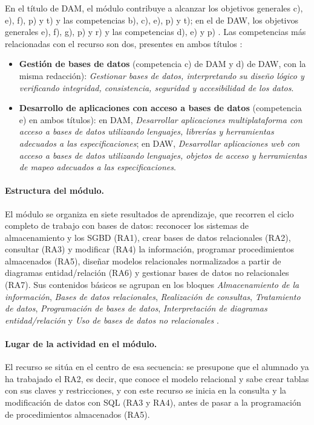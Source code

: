 \documentclass[11pt,a4paper]{article}
\begin{document}
En el título de DAM, el módulo contribuye a alcanzar los objetivos generales c), e), f), p)
y t) y las competencias b), c), e), p) y t); en el de DAW, los objetivos generales e), f), g),
p) y r) y las competencias d), e) y p) \cite{rd405}. Las competencias más relacionadas con el
recurso son dos, presentes en ambos títulos \cite{rd450,rd686}:
\begin{itemize}
  \item \textbf{Gestión de bases de datos} (competencia c) de DAM y d) de DAW, con la misma
        redacción): \textit{Gestionar bases de datos, interpretando su diseño lógico y
        verificando integridad, consistencia, seguridad y accesibilidad de los datos}.
  \item \textbf{Desarrollo de aplicaciones con acceso a bases de datos} (competencia e) en
        ambos títulos): en DAM, \textit{Desarrollar aplicaciones multiplataforma con acceso a
        bases de datos utilizando lenguajes, librerías y herramientas adecuados a las
        especificaciones}; en DAW, \textit{Desarrollar aplicaciones web con acceso a bases de
        datos utilizando lenguajes, objetos de acceso y herramientas de mapeo adecuados a las
        especificaciones}.
\end{itemize}

\paragraph{Estructura del módulo.} El módulo se organiza en siete resultados de aprendizaje,
que recorren el ciclo completo de trabajo con bases de datos: reconocer los sistemas de
almacenamiento y los SGBD (RA1), crear bases de datos relacionales (RA2), consultar (RA3)
y modificar (RA4) la información, programar procedimientos almacenados (RA5), diseñar
modelos relacionales normalizados a partir de diagramas entidad/relación (RA6) y gestionar
bases de datos no relacionales (RA7). Sus contenidos básicos se agrupan en los bloques
\emph{Almacenamiento de la información}, \emph{Bases de datos relacionales},
\emph{Realización de consultas}, \emph{Tratamiento de datos}, \emph{Programación de bases de
datos}, \emph{Interpretación de diagramas entidad/relación} y \emph{Uso de bases de datos no
relacionales} \cite{rd405}.

\paragraph{Lugar de la actividad en el módulo.} El recurso se sitúa en el centro de esa
secuencia: se presupone que el alumnado ya ha trabajado el RA2, es decir, que conoce el modelo
relacional y sabe crear tablas con sus claves y restricciones, y con este recurso se inicia en
la consulta y la modificación de datos con SQL (RA3 y RA4), antes de pasar a la programación
de procedimientos almacenados (RA5).
\end{document}
